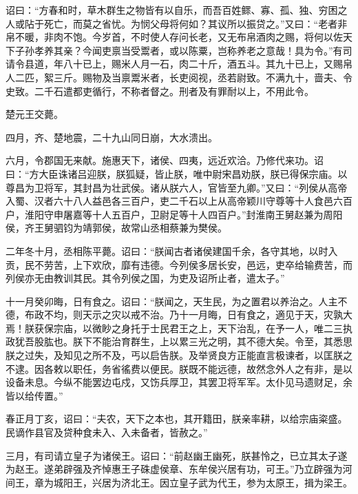 \documentclass[12pt,UTF8]{ctexbook}
\begin{document}
诏曰：“方春和时，草木群生之物皆有以自乐，而吾百姓鳏、寡、孤、独、穷困之人或阽于死亡，而莫之省忧。为悯父母将何如？其议所以振贷之。”又曰：“老者非帛不暖，非肉不饱。今岁首，不时使人存问长老，又无布帛酒肉之赐，将何以佐天下子孙孝养其亲？今闻吏禀当受鬻者，或以陈粟，岂称养老之意哉！具为令。”有司请令县道，年八十已上，赐米人月一石，肉二十斤，酒五斗。其九十已上，又赐帛人二匹，絮三斤。赐物及当禀鬻米者，长吏阅视，丞若尉致。不满九十，啬夫、令史致。二千石遣都吏循行，不称者督之。刑者及有罪耐以上，不用此令。



楚元王交薨。



四月，齐、楚地震，二十九山同日崩，大水溃出。



六月，令郡国无来献。施惠天下，诸侯、四夷，远近欢洽。乃修代来功。诏曰：“方大臣诛诸吕迎朕，朕狐疑，皆止朕，唯中尉宋昌劝朕，朕已得保宗庙。以尊昌为卫将军，其封昌为壮武侯。诸从朕六人，官皆至九卿。”又曰：“列侯从高帝入蜀、汉者六十八人益邑各三百户，吏二千石以上从高帝颖川守尊等十人食邑六百户，淮阳守申屠嘉等十人五百户，卫尉足等十人四百户。”封淮南王舅赵兼为周阳侯，齐王舅驷钧为靖郭侯，故常山丞相蔡兼为樊侯。



二年冬十月，丞相陈平薨。诏曰：“朕闻古者诸侯建国千余，各守其地，以时入贡，民不劳苦，上下欢欣，靡有违德。今列侯多居长安，邑远，吏卒给输费苦，而列侯亦无由教训其民。其令列侯之国，为吏及诏所止者，遣太子。”



十一月癸卯晦，日有食之。诏曰：“朕闻之，天生民，为之置君以养治之。人主不德，布政不均，则天示之灾以戒不治。乃十一月晦，日有食之，適见于天，灾孰大焉！朕获保宗庙，以微眇之身托于士民君王之上，天下治乱，在予一人，唯二三执政犹吾股肱也。朕下不能治育群生，上以累三光之明，其不德大矣。令至，其悉思朕之过失，及知见之所不及，丐以启告朕。及举贤良方正能直言极谏者，以匡朕之不逮。因各敕以职任，务省徭费以便民。朕既不能远德，故然念外人之有非，是以设备未息。今纵不能罢边屯戍，又饬兵厚卫，其罢卫将军军。太仆见马遗财足，余皆以给传置。”



春正月丁亥，诏曰：“夫农，天下之本也，其开籍田，朕亲率耕，以给宗庙粢盛。民谪作县官及贷种食未入、入未备者，皆赦之。”



三月，有司请立皇子为诸侯王。诏曰：“前赵幽王幽死，朕甚怜之，已立其太子遂为赵王。遂弟辟强及齐悼惠王子硃虚侯章、东牟侯兴居有功，可王。”乃立辟强为河间王，章为城阳王，兴居为济北王。因立皇子武为代王，参为太原王，揖为梁王。
\end{document}
